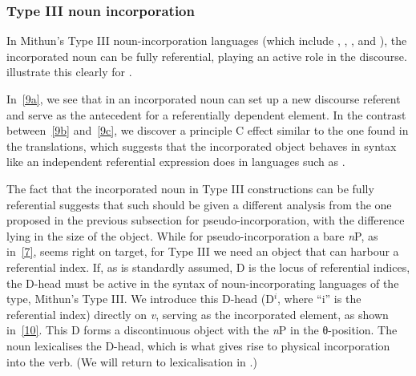 \documentclass[output=paper]{langsci/langscibook}
\begin{document}
\begin{refcontext}
\subsubsection{Type III noun incorporation}
In Mithun’s Type III noun-incorporation languages (which include ,
, , and ), the incorporated noun can be fully referential,
playing an active role in the discourse.  \citet[145--146]{bakeretal05}
illustrate this clearly for .

\ea \label{9}
    \z
\z
In~\eqref{9a}, we see that in  an incorporated noun can set up a new
discourse referent and serve as the antecedent for a referentially dependent
element. In the contrast between~\eqref{9b} and~\eqref{9c}, we discover a principle
C effect similar to the one found in the  translations, which suggests
that the incorporated object behaves in syntax like an independent referential
expression does in languages such as .

The fact that the incorporated noun in Type III constructions can be fully
referential suggests that such  should be given a different
analysis from the one proposed in the previous subsection for
pseudo-incorporation, with the difference lying in the size of the object.
While for pseudo-incorporation a bare \emph{n}P, as in~\eqref{7}, seems right on
target, for Type III  we need an object that can harbour a
referential index. If, as is standardly assumed, D is the locus of referential
indices, the D-head must be active in the syntax of noun-incorporating
languages of the  type, Mithun’s Type III. We introduce this D-head
(D$^i$, where \enquote{i} is the referential index) directly on \emph{v}, serving as
the incorporated element, as shown in~\eqref{10}. This D forms a discontinuous
object with the \emph{n}P in the θ{}-position. The noun lexicalises
the  D-head, which is what gives rise to physical incorporation into the verb.
(We will return to lexicalisation in .)


\end{refcontext}
\end{document}
